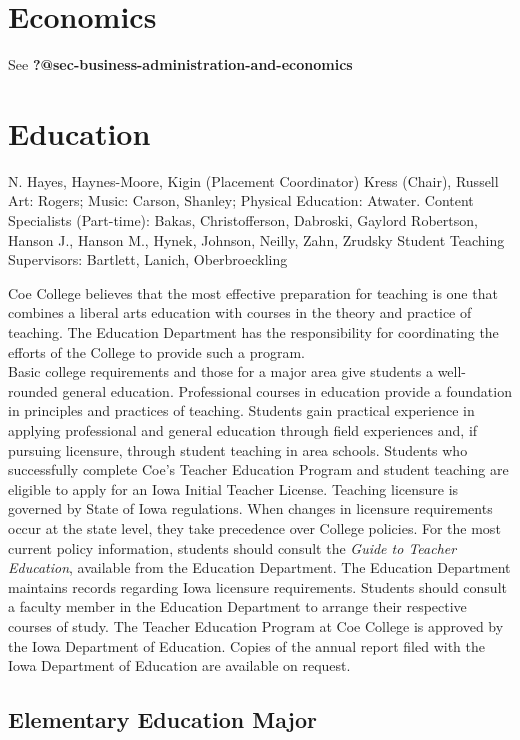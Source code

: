 \documentclass[
  letterpaper,
]{scrbook}
\begin{document}
\section{Economics}\label{sec-economics}

See \textbf{?@sec-business-administration-and-economics}

\section{Education}\label{sec-education}

N. Hayes, Haynes-Moore, Kigin (Placement Coordinator) Kress (Chair),
Russell Art: Rogers; Music: Carson, Shanley; Physical Education:
Atwater. Content Specialists (Part-time): Bakas, Christofferson,
Dabroski, Gaylord Robertson, Hanson J., Hanson M., Hynek, Johnson,
Neilly, Zahn, Zrudsky Student Teaching Supervisors: Bartlett, Lanich,
Oberbroeckling

Coe College believes that the most effective preparation for teaching is
one that combines a liberal arts education with courses in the theory
and practice of teaching. The Education Department has the
responsibility for coordinating the efforts of the College to provide
such a program.\\
Basic college requirements and those for a major area give students a
well-rounded general education. Professional courses in education
provide a foundation in principles and practices of teaching. Students
gain practical experience in applying professional and general education
through field experiences and, if pursuing licensure, through student
teaching in area schools. Students who successfully complete Coe's
Teacher Education Program and student teaching are eligible to apply for
an Iowa Initial Teacher License. Teaching licensure is governed by State
of Iowa regulations. When changes in licensure requirements occur at the
state level, they take precedence over College policies. For the most
current policy information, students should consult the \emph{Guide to
Teacher Education}, available from the Education Department. The
Education Department maintains records regarding Iowa licensure
requirements. Students should consult a faculty member in the Education
Department to arrange their respective courses of study. The Teacher
Education Program at Coe College is approved by the Iowa Department of
Education. Copies of the annual report filed with the Iowa Department of
Education are available on request.

\subsection{Elementary Education
Major}\label{elementary-education-major}
\end{document}

